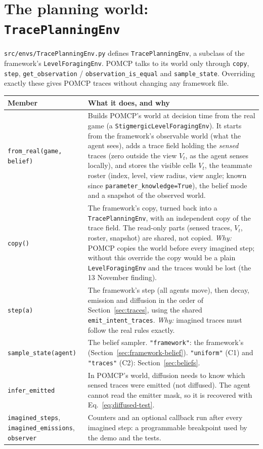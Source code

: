 \documentclass[11pt,a4paper]{article}
\newcommand{\file}{\nolinkurl}  %
\newcommand{\code}[1]{\texttt{#1}}
\theoremstyle{remark}
\begin{document}
\section{The planning world: \texttt{TracePlanningEnv}}
\label{sec:planning-world}

\file{src/envs/TracePlanningEnv.py} defines \code{TracePlanningEnv}, a subclass of the framework's
\code{LevelForagingEnv}. POMCP talks to its world only through \code{copy}, \code{step}, \code{get\_observation} /
\code{observation\_is\_equal} and \code{sample\_state}. Overriding exactly these gives POMCP traces without changing any
framework file.

\begin{center}
\small
\begin{tabular}{p{3.3cm}p{11.2cm}}
\toprule
Member & What it does, and why \\
\midrule
\code{from\_real(game, belief)} & Builds POMCP's world at decision time from the real game (a
  \code{StigmergicLevelForagingEnv}). It starts from the framework's observable world (what the agent sees), adds a trace
  field holding the \emph{sensed} traces (zero outside the view $V_t$, as the agent senses locally), and stores the
  visible cells $V_t$, the teammate roster (index, level, view radius, view angle; known since
  \code{parameter\_knowledge=True}), the belief mode and a snapshot of the observed world. \\
\code{copy()} & The framework's copy, turned back into a \code{TracePlanningEnv}, with an independent copy of the trace
  field. The read-only parts (sensed traces, $V_t$, roster, snapshot) are shared, not copied. \emph{Why:} POMCP copies
  the world before every imagined step; without this override the copy would be a plain \code{LevelForagingEnv} and the
  traces would be lost (the 13 November finding). \\
\code{step(a)} & The framework's step (all agents move), then decay, emission and diffusion in the order of
  Section~\ref{sec:traces}, using the shared \code{emit\_intent\_traces}. \emph{Why:} imagined traces must follow the
  real rules exactly. \\
\code{sample\_state(agent)} & The belief sampler. \code{"framework"}: the framework's
  (Section~\ref{sec:framework-belief}). \code{"uniform"} (C1) and \code{"traces"} (C2): Section~\ref{sec:beliefs}. \\
\code{infer\_emitted} & In POMCP's world, diffusion needs to know which sensed traces were emitted (not diffused).
  The agent cannot read the emitter mask, so it is recovered with Eq.~\eqref{eq:diffused-test}. \\
\code{imagined\_steps}, \code{imagined\_emissions}, \code{observer} & Counters and an optional callback run after every
  imagined step: a programmable breakpoint used by the demo and the tests. \\
\bottomrule
\end{tabular}
\end{center}
\end{document}
